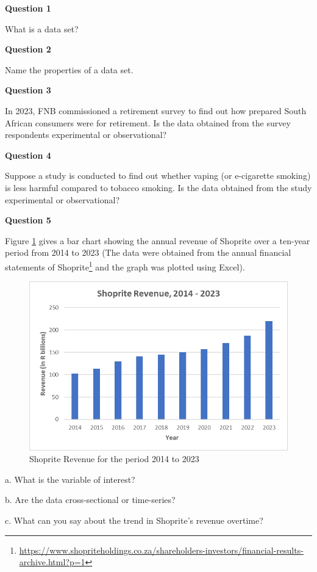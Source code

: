 \documentclass[
]{book}
\begin{document}
\textbf{Question 1}

What is a data set?

\textbf{Question 2}

Name the properties of a data set.

\textbf{Question 3}

In 2023, FNB commissioned a retirement survey to find out how prepared South African consumers were for retirement. Is the data obtained from the survey respondents experimental or observational?

\textbf{Question 4}

Suppose a study is conducted to find out whether vaping (or e-cigarette smoking) is less harmful compared to tobacco smoking. Is the data obtained from the study experimental or observational?

\textbf{Question 5}

Figure \ref{fig:figshp} gives a bar chart showing the annual revenue of Shoprite over a ten-year period from 2014 to 2023 (The data were obtained from the annual financial statements of Shoprite\footnote{\url{https://www.shopriteholdings.co.za/shareholders-investors/financial-results-archive.html?p=1}} and the graph was plotted using Excel).

\begin{figure}
\includegraphics[width=10.78in]{images/clipboard-3088691256} \caption{Shoprite Revenue for the period 2014 to 2023}\label{fig:figshp}
\end{figure}

a. What is the variable of interest?

b. Are the data cross-sectional or time-series?

c. What can you say about the trend in Shoprite's revenue overtime?
\end{document}
